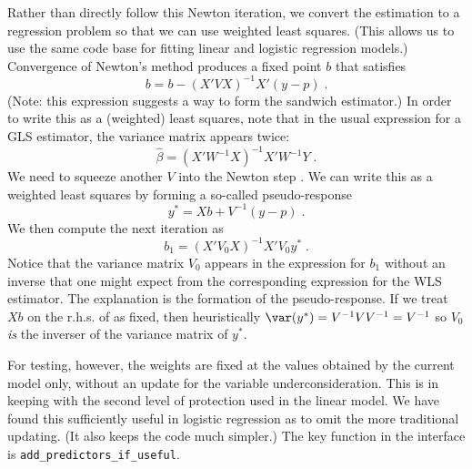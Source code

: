 \documentclass[12pt]{article}
\begin{document}
 Rather than directly follow this Newton iteration, we convert the estimation to
 a regression problem so that we can use weighted least squares.  (This allows
 us to use the same code base for fitting linear and logistic regression
 models.)  Convergence of Newton's method produces a fixed point $b$ that
 satisfies
\begin{displaymath}
  b = b - (X'VX)^{-1}X'(y-p) \;.
\end{displaymath}
 (Note: this expression suggests a way to form the sandwich estimator.) In order
 to write this as a (weighted) least squares, note that in the usual expression
 for a GLS estimator, the variance matrix appears twice:
\begin{displaymath}
  \hat\beta = (X'W^{-1}X)^{-1}X'W^{-1}Y \;.
\end{displaymath}
 We need to squeeze another $V$ into the Newton step .  We can
 write this as a weighted least squares by forming a so-called pseudo-response
\begin{equation}
 y^{*} = Xb + V^{-1}(y-p) \;.
\label{eq:ystar}
\end{equation}
  We then compute the next iteration as
\begin{equation}
  b_1 = (X'V_0X)^{-1}X'V_0y^{*} \;.
\label{eq:irls}
\end{equation}
 Notice that the variance matrix $V_0$ appears in the expression for $b_1$
 without an inverse that one might expect from the corresponding expression for
 the WLS estimator.  The explanation is the formation of the pseudo-response.
  If we treat $Xb$ on the r.h.s. of  as fixed, then heuristically
 $\var(y^{*}) = V^{-1}V V^{-1} = V^{-1}$ so $V_0$ {\em is} the inverser of the
 variance matrix of $y^{*}$.


 For testing, however, the weights are fixed at the values obtained by the
 current model only, without an update for the variable underconsideration.
  This is in keeping with the second level of protection used in the linear
 model.  We have found this sufficiently useful in logistic regression as to
 omit the more traditional updating.  (It also keeps the code much simpler.)
  The key function in the interface is {\tt add\_predictors\_if\_useful}.
 
\end{document}
